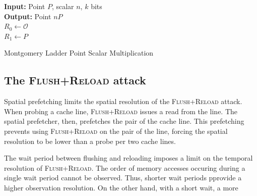 \documentclass{llncs}
\begin{document}
\vspace{-0.5cm}
\begin{algorithm}[htb]\label{mont}
 \SetAlgoLined
{\bf Input:} Point $P$, scalar $n$, $k$ bits\\
{\bf Output:} Point $nP$\\
$R_0\gets \mathcal{O}$\\
$R_1\gets P$\\
 \caption{Montgomery Ladder Point Scalar Multiplication}
\end{algorithm}\vspace{-0.5cm}




\newpage

\subsection{The \textsc{Flush+Reload} attack}

Spatial prefetching limits the spatial resolution of the \textsc{Flush+Reload} attack.
When probing a cache line, \textsc{Flush+Reload} issues a read from the line.  
The spatial prefetcher, then, prefetches the pair of the cache line. 
This prefetching prevents using \textsc{Flush+Reload} on the pair of the line,
forcing the spatial resolution to be lower than a probe per two cache lines.

The wait period between flushing and reloading imposes a limit on the temporal resolution of \textsc{Flush+Reload}.
The order of memory accesses occuring during a single wait period cannot be observed.
Thus, shorter wait periods pprovide a higher observation resolution.
On the other hand, with a short wait, a more 
\end{document}
